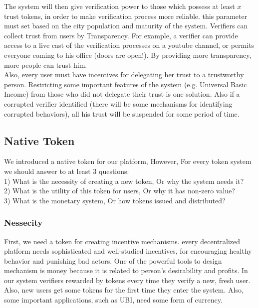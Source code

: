 \documentclass[conference]{IEEEtran}
\begin{document}
The system will then give verification power to those which possess at least $x$ trust tokens, in order to make verification process more reliable. this parameter must set based on the city population and maturity of the system. Verifiers can collect trust from users by Transparency. For example, a verifier can provide access to a live cast of the verification processes on a youtube channel, or permits everyone coming to his office (doors are open!). By providing more transparency, more people can trust him.\\
Also, every user must have incentives for delegating her trust to a trustworthy person. Restricting some important features of the system (e.g. Universal Basic Income) from those who did not delegate their trust is one solution. Also if a corrupted verifier identified (there will be some mechanisms for identifying corrupted behaviors), all his trust will be suspended for some period of time.




\subsection{Native Token}
We introduced a native token for our platform, However, For every  token system we should answer to at least 3 questions:
\\
1) What is the necessity of creating a new token, Or why the system needs it?
\\
2) What is the utility of this token for users, Or why it has non-zero value?
\\
3) What is the monetary system, Or how tokens issued and distributed?
\\
\subsubsection{Nessecity}
First, we need a token for creating incentive mechanisms. every decentralized platform needs sophisticated and well-studied incentives, for encouraging healthy behavior and punishing bad actors. One of the powerful tools to design mechanism is money because it is related to person's desirability and profits. In our system verifiers rewarded by tokens every time they verify a new, fresh user. Also, new users get some tokens for the first time they enter the system. Also, some important applications, such as UBI, need some form of currency.
\end{document}
